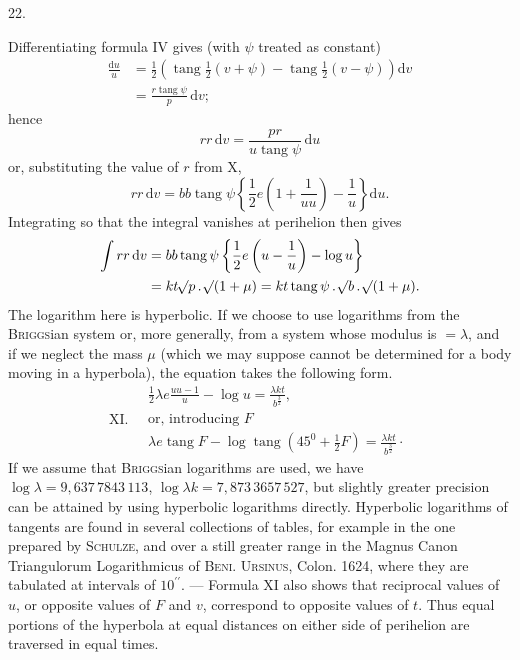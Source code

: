 \par{}
\begin{center}
22.
\end{center}
Differentiating formula IV gives (with $\psi$ treated as constant)
\[
\begin{aligned}
\frac{\mathrm{d}u}{u}&=\frac{1}{2}\left(\operatorname{tang}\frac{1}{2}(v+\psi)-\operatorname{tang}\frac{1}{2}(v-\psi)\right)\mathrm{d}v\\
&=\frac{r\operatorname{tang}\psi}{p}\,\mathrm{d}v;
\end{aligned}
\]
hence
\[
r r\,\mathrm{d}v=\frac{p r}{u\operatorname{tang}\psi}\,\mathrm{d}u
\]
or, substituting the value of $r$ from X,
\[
r r\,\mathrm{d}v=b b\operatorname{tang}\psi\left\{\frac{1}{2}e\left(1+\frac{1}{u u}\right)-\frac{1}{u}\right\}\mathrm{d}u.
\]
Integrating so that the integral vanishes at perihelion then gives
\[
\begin{aligned}
\int r r\,\mathrm{d}v&=b b\operatorname{tang}\psi\left\{\frac{1}{2}e\left(u-\frac{1}{u}\right)-\log u\right\}\\
&=k t\mathord{{}^{}\!\surd}p\, .\,\mathord{{}^{}\!\surd}(1+\mu)=k t\operatorname{tang}\psi\, .\,\mathord{{}^{}\!\surd}b\, .\,\mathord{{}^{}\!\surd}(1+\mu).
\end{aligned}
\]
The logarithm here is hyperbolic. If we choose to use logarithms from the \textsc{Briggs}ian system or, more generally, from a system whose modulus is $=\lambda$, and if we neglect the mass $\mu$ (which we may suppose cannot be determined for a body moving in a hyperbola), the equation takes the following form.
\[
\mathrm{XI.}\quad\begin{gathered}
\frac{1}{2}\lambda e\frac{u u-1}{u}-\log u=\frac{\lambda k t}{b^{\frac{3}{2}}},\\
\text{or, introducing }F\\
\lambda e\operatorname{tang}F-\log\operatorname{tang}(45^0+\frac{1}{2}F)=\frac{\lambda k t}{b^{\frac{3}{2}}}\cdot
\end{gathered}
\]
If we assume that \textsc{Briggs}ian logarithms are used, we have \\
$\log\lambda=9{,}637\,7843\,113$, $\log\lambda k=7{,}873\,3657\,527$, but slightly greater precision can be attained by using hyperbolic logarithms directly. Hyperbolic logarithms of tangents are found in several collections of tables, for example in the one prepared by \textsc{Schulze}, and over a still greater range in the Magnus Canon Triangulorum Logarithmicus of \textsc{Beni. Ursinus}, Colon. 1624, where they are tabulated at intervals of $10^{\prime\prime}$. — Formula XI also shows that reciprocal values of $u$, or opposite values of $F$ and $v$, correspond to opposite values of $t$. Thus equal portions of the hyperbola at equal distances on either side of perihelion are traversed in equal times.
